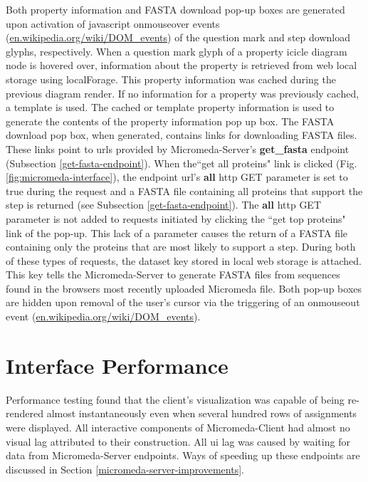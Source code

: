 Both property information and FASTA download pop-up boxes are generated upon activation of \gls{javascript} onmouseover events \cite{dom-events} (\href{http://en.wikipedia.org/wiki/DOM_events}{en.wikipedia.org/wiki/DOM\_events}) of the question mark and step download glyphs, respectively. When a question mark glyph of a property icicle diagram node is hovered over, information about the property is retrieved from web local storage using localForage. This property information was cached during the previous diagram render. If no information for a property was previously cached, a template is used. The cached or template property information is used to generate the contents of the property information pop up box. The FASTA download pop box, when generated, contains links for downloading FASTA files. These links point to \gls{url}s provided by Micromeda-Server's \textbf{get\_fasta} endpoint (Subsection \ref{get-fasta-endpoint}). When the``get all proteins" link is clicked (Fig. \ref{fig:micromeda-interface}), the endpoint \gls{url}'s \textbf{all} \gls{http} GET parameter is set to true during the request and a FASTA file containing all proteins that support the step is returned (see Subsection \ref{get-fasta-endpoint}). The \textbf{all} \gls{http} GET parameter is not added to requests initiated by clicking the ``get top proteins" link of the pop-up. This lack of a parameter causes the return of a FASTA file containing only the proteins that are most likely to support a step. During both of these types of requests, the dataset key stored in local web storage is attached. This key tells the Micromeda-Server to generate FASTA files from sequences found in the browsers most recently uploaded Micromeda file. Both pop-up boxes are hidden upon removal of the user's cursor via the triggering of an onmouseout event \cite{dom-events} (\href{http://en.wikipedia.org/wiki/DOM_events}{en.wikipedia.org/wiki/DOM\_events}).

\section{Interface Performance}

Performance testing found that the client's visualization was capable of being re-rendered almost instantaneously even when several hundred rows of assignments were displayed. All interactive components of Micromeda-Client had almost no visual lag attributed to their construction. All \gls{ui} lag was caused by waiting for data from Micromeda-Server endpoints. Ways of speeding up these endpoints are discussed in Section \ref{micromeda-server-improvements}.

